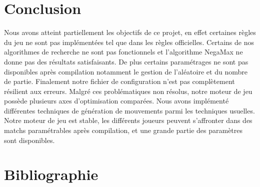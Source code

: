 \huge\documentclass{article}
\begin{document}
\section{Conclusion}

Nous avons atteint partiellement les objectifs de ce projet, en effet certaines règles du jeu ne sont pas implémentées tel que dans les règles officielles. Certains de nos algorithmes de recherche ne sont pas fonctionnels et l'algorithme NegaMax ne donne pas des résultats satisfaisants. \newline
De plus certains paramétrages ne sont pas disponibles après compilation notamment le gestion de l'aléatoire et du nombre de partie.
Finalement notre fichier de configuration n'est pas complètement résilient aux erreurs.\newline
Malgré ces problématiques non résolus, notre moteur de jeu possède plusieurs axes d'optimisation comparées. Nous avons implémenté différentes techniques de génération de mouvements parmi les techniques usuelles. \newline
Notre moteur de jeu est stable, les différents joueurs peuvent s'affronter dans des matchs paramétrables après compilation, et une grande partie des paramètres sont disponibles.

\section{Bibliographie}



\end{document}

